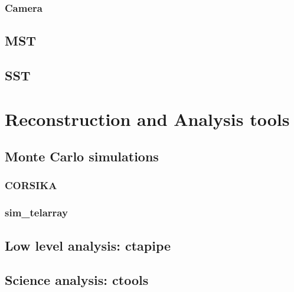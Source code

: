 \documentclass[main.tex]{subfiles}
\begin{document}
  
  \subsubsection{Camera}
  
\subsection{MST}
\subsection{SST}
\section{Reconstruction and Analysis tools} \label{sec:ctaanalysis}
\subsection{Monte Carlo simulations}
\subsubsection{CORSIKA}
\subsubsection{sim\_telarray}
\subsection{Low level analysis: ctapipe}
\subsection{Science analysis: ctools}
\end{document}
